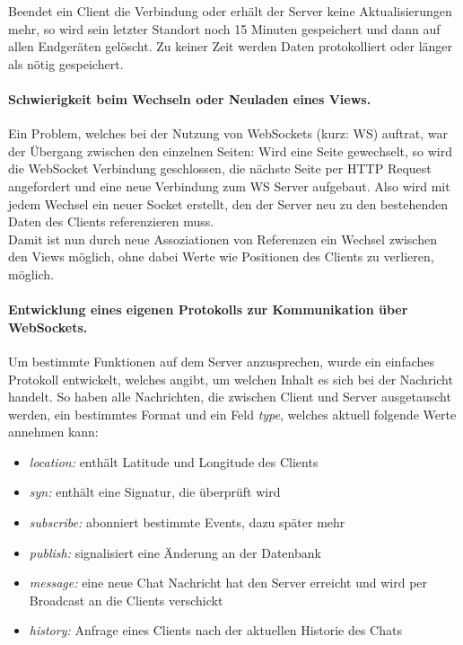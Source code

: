 Beendet ein Client die Verbindung oder erhält der Server keine Aktualisierungen mehr, so wird sein letzter Standort noch 15 Minuten gespeichert und dann auf allen Endgeräten gelöscht. Zu keiner Zeit werden Daten protokolliert oder länger als nötig gespeichert.\par

\paragraph{Schwierigkeit beim Wechseln oder Neuladen eines Views.}
Ein Problem, welches bei der Nutzung von WebSockets (kurz: WS) auftrat, war der Übergang zwischen den einzelnen Seiten: Wird eine Seite gewechselt, so wird die WebSocket Verbindung geschlossen, die nächste Seite per HTTP Request angefordert und eine neue Verbindung zum WS Server aufgebaut. Also wird mit jedem Wechsel ein neuer Socket erstellt, den der Server neu zu den bestehenden Daten des Clients referenzieren muss.\\
Damit ist nun durch neue Assoziationen von Referenzen ein Wechsel zwischen den Views möglich, ohne dabei Werte wie Positionen des Clients zu verlieren, möglich.

\paragraph{Entwicklung eines eigenen Protokolls zur Kommunikation über WebSockets.}
Um bestimmte Funktionen auf dem Server anzusprechen, wurde ein einfaches Protokoll entwickelt, welches angibt, um welchen Inhalt es sich bei der Nachricht handelt. So haben alle Nachrichten, die zwischen Client und Server ausgetauscht werden, ein bestimmtes Format und ein Feld \emph{type}, welches aktuell folgende Werte annehmen kann:

\begin{itemize}
	\item[] \emph{location:} enthält Latitude und Longitude des Clients
	\item[] \emph{syn:} enthält eine Signatur, die überprüft wird
	\item[] \emph{subscribe:} abonniert bestimmte Events, dazu später mehr
	\item[] \emph{publish:} signalisiert eine Änderung an der Datenbank
	\item[] \emph{message:} eine neue Chat Nachricht hat den Server erreicht und wird per Broadcast an die Clients verschickt
	\item[] \emph{history:} Anfrage eines Clients nach der aktuellen Historie des Chats
\end{itemize}

